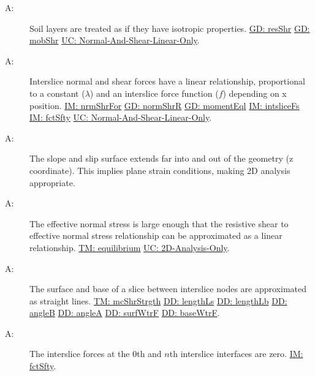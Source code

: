 \documentclass[12pt]{article}
\newcounter{assumpnum}
\newcommand{\atheassumpnum}{A\theassumpnum}
\begin{document}
\begin{description}
\item[\atheassumpnum\label{A:Soil-Layers-Isotropic}:]Soil layers are treated as if they have isotropic properties. \hyperref[GD:resShr]{GD: resShr} \hyperref[GD:mobShr]{GD: mobShr} \hyperref[UC_normshearlinear]{UC: Normal-And-Shear-Linear-Only}.
\end{description}
\begin{description}
\item[\atheassumpnum\label{A:Interslice-Norm-Shear-Forces-Linear}:]Interslice normal and shear forces have a linear relationship, proportional to a constant ($λ$) and an interslice force function ($f$) depending on x position. \hyperref[IM:nrmShrFor]{IM: nrmShrFor} \hyperref[GD:normShrR]{GD: normShrR} \hyperref[GD:momentEql]{GD: momentEql} \hyperref[IM:intsliceFs]{IM: intsliceFs} \hyperref[IM:fctSfty]{IM: fctSfty} \hyperref[UC_normshearlinear]{UC: Normal-And-Shear-Linear-Only}.
\end{description}
\begin{description}
\item[\atheassumpnum\label{A:Plane-Strain-Conditions}:]The slope and slip surface extends far into and out of the geometry (z coordinate). This implies plane strain conditions, making 2D analysis appropriate.
\end{description}
\begin{description}
\item[\atheassumpnum\label{A:Effective-Norm-Stress-Large}:]The effective normal stress is large enough that the resistive shear to effective normal stress relationship can be approximated as a linear relationship. \hyperref[TM:equilibrium]{TM: equilibrium} \hyperref[UC_2donly]{UC: 2D-Analysis-Only}.
\end{description}
\begin{description}
\item[\atheassumpnum\label{A:Surface-Base-Slice-between-Interslice-Straight-Lines}:]The surface and base of a slice between interslice nodes are approximated as straight lines. \hyperref[TM:mcShrStrgth]{TM: mcShrStrgth} \hyperref[DD:lengthLs]{DD: lengthLs} \hyperref[DD:lengthLb]{DD: lengthLb} \hyperref[DD:angleB]{DD: angleB} \hyperref[DD:angleA]{DD: angleA} \hyperref[DD:surfWtrF]{DD: surfWtrF} \hyperref[DD:baseWtrF]{DD: baseWtrF}.
\end{description}
\begin{description}
\item[\atheassumpnum\label{A:Edge-Slices}:]The interslice forces at the 0th and $n$th interslice interfaces are zero. \hyperref[IM:fctSfty]{IM: fctSfty}.
\end{description}
\end{document}
